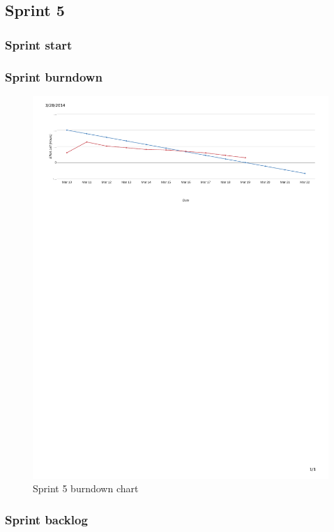 \subsection{Sprint 5}
\subsubsection{Sprint start}

\subsubsection{Sprint burndown}



\begin{figure}[H]
\includegraphics[width=\textwidth, trim= 1cm 21cm 1cm 1cm, clip=true]{ch/projectManagement/fig/burndown4.pdf}
\caption{Sprint 5 burndown chart}
\label{fig:sprint5burndown}
\end{figure}

\subsubsection{Sprint backlog}



